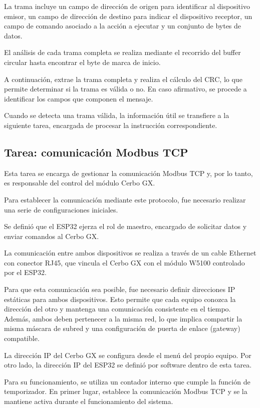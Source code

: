 La trama incluye un campo de dirección de origen para identificar al dispositivo emisor, un campo de dirección de destino para indicar el dispositivo receptor, un campo de comando asociado a la acción a ejecutar y un conjunto de bytes de datos.

El análisis de cada trama completa se realiza mediante el recorrido del buffer circular hasta encontrar el byte de marca de inicio.

A continuación, extrae la trama completa y realiza el cálculo del CRC,
lo que permite determinar si la trama es válida o no. En caso afirmativo, se
procede a identificar los campos que componen el mensaje.

Cuando se detecta una trama válida, la información útil se transfiere a
la siguiente tarea, encargada de procesar la instrucción correspondiente.


\subsection{Tarea: comunicación Modbus TCP}
\label{sec:comando_modbus}
Esta tarea se encarga de gestionar la comunicación
Modbus TCP y, por lo tanto, es responsable del control del módulo
Cerbo GX.

Para establecer la comunicación mediante este protocolo, fue necesario
realizar una serie de configuraciones iniciales.

Se definió que el ESP32 ejerza el rol de maestro, encargado de
solicitar datos y enviar comandos al Cerbo GX.

La comunicación entre ambos dispositivos se realiza a través de un
cable Ethernet con conector RJ45, que vincula el Cerbo GX con el
módulo W5100 controlado por el ESP32.

Para que esta comunicación sea posible, fue necesario definir
direcciones IP estáticas para ambos dispositivos. Esto permite que cada
equipo conozca la dirección del otro y mantenga una comunicación
consistente en el tiempo. Además, ambos deben pertenecer a la misma red,
lo que implica compartir la misma máscara de subred y una configuración
de puerta de enlace (gateway) compatible.

La dirección IP del Cerbo GX se configura desde el menú del propio
equipo. Por otro lado, la dirección IP del ESP32 se definió por
software dentro de esta tarea.

Para su funcionamiento, se utiliza un contador interno que cumple la función de
temporizador. En primer lugar, establece la comunicación Modbus TCP y se
la mantiene activa durante el funcionamiento del sistema.

